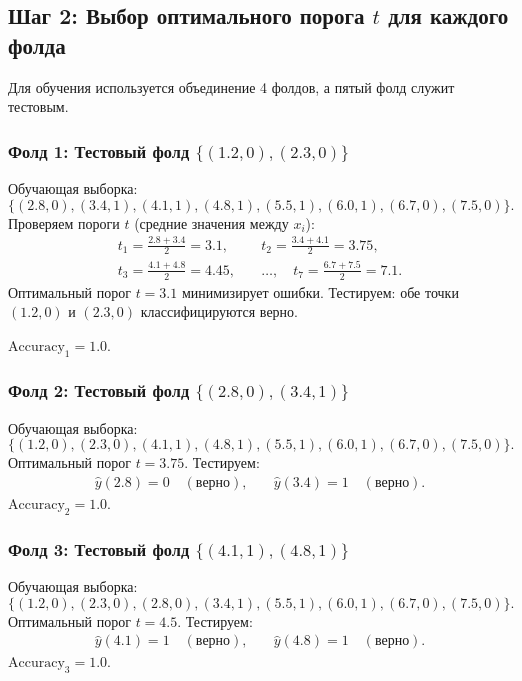 \subsection*{Шаг 2: Выбор оптимального порога \( t \) для каждого фолда}

Для обучения используется объединение 4 фолдов, а пятый фолд служит тестовым. 

\subsubsection*{Фолд 1: Тестовый фолд \(\{(1.2, 0), (2.3, 0)\}\)}
Обучающая выборка:
\[
\{(2.8, 0), (3.4, 1), (4.1, 1), (4.8, 1), (5.5, 1), (6.0, 1), (6.7, 0), (7.5, 0)\}.
\]
Проверяем пороги \( t \) (средние значения между \( x_i \)):
\[
\begin{aligned}
t_1 = \frac{2.8 + 3.4}{2} = 3.1, & \quad t_2 = \frac{3.4 + 4.1}{2} = 3.75, \\
t_3 = \frac{4.1 + 4.8}{2} = 4.45, & \quad \dots, \quad t_7 = \frac{6.7 + 7.5}{2} = 7.1.
\end{aligned}
\]
Оптимальный порог \( t = 3.1 \) минимизирует ошибки. Тестируем: обе точки \((1.2, 0)\) и \((2.3, 0)\) классифицируются верно. 

\(\text{Accuracy}_1 = 1.0\).

\subsubsection*{Фолд 2: Тестовый фолд \(\{(2.8, 0), (3.4, 1)\}\)}
Обучающая выборка:
\[
\{(1.2, 0), (2.3, 0), (4.1, 1), (4.8, 1), (5.5, 1), (6.0, 1), (6.7, 0), (7.5, 0)\}.
\]
Оптимальный порог \( t = 3.75 \). Тестируем:
\[
\begin{aligned}
\hat{y}(2.8) = 0 \quad (\text{верно}), & \quad \hat{y}(3.4) = 1 \quad (\text{верно}).
\end{aligned}
\]
\(\text{Accuracy}_2 = 1.0\).

\subsubsection*{Фолд 3: Тестовый фолд \(\{(4.1, 1), (4.8, 1)\}\)}
Обучающая выборка:
\[
\{(1.2, 0), (2.3, 0), (2.8, 0), (3.4, 1), (5.5, 1), (6.0, 1), (6.7, 0), (7.5, 0)\}.
\]
Оптимальный порог \( t = 4.5 \). Тестируем:
\[
\begin{aligned}
\hat{y}(4.1) = 1 \quad (\text{верно}), & \quad \hat{y}(4.8) = 1 \quad (\text{верно}).
\end{aligned}
\]
\(\text{Accuracy}_3 = 1.0\).

